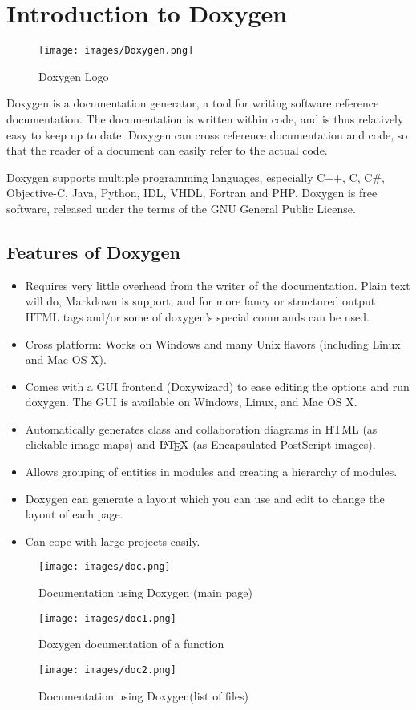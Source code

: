 \section{Introduction to Doxygen}
\begin{figure}[H]
\centering \texttt{[image: images/Doxygen.png]}
\caption{Doxygen Logo}
\end{figure}
Doxygen is a documentation generator, a tool for writing software reference 
documentation. The documentation is written within code, and is thus 
relatively easy to keep up to date. Doxygen can cross reference 
documentation and code, so that the reader of a document can easily 
refer to the actual code.

Doxygen supports multiple programming languages, especially C++, C, 
C\#, Objective-C, Java, Python, IDL, VHDL, Fortran and PHP. Doxygen
 is free software, released under the terms of the GNU General Public 
License.\\

\subsection{Features of Doxygen}
\begin{itemize}
\item Requires very little overhead from the writer of the documentation. 
Plain text will do, Markdown is support, and for more fancy or structured 
output HTML tags and/or some of doxygen's special commands can be used.
\item Cross platform: Works on Windows and many Unix flavors (including 
Linux and Mac OS X).
\item Comes with a GUI frontend (Doxywizard) to ease editing the options 
and run doxygen. The GUI is available on Windows, Linux, and Mac OS X.
\item Automatically generates class and collaboration diagrams in HTML 
(as clickable image maps) and $\mbox{\LaTeX}$ (as Encapsulated PostScript 
images).
\item Allows grouping of entities in modules and creating a hierarchy 
of modules.
\item Doxygen can generate a layout which you can use and edit to change 
the layout of each page.
\item Can cope with large projects easily.
\end{itemize}

\begin{figure}
\centering \texttt{[image: images/doc.png]}
\caption{Documentation using Doxygen (main page)}
\end{figure}


\begin{figure}
\centering \texttt{[image: images/doc1.png]}
\caption{Doxygen documentation of a function}
\end{figure}
\begin{figure}
\centering \texttt{[image: images/doc2.png]}
\caption{Documentation using Doxygen(list of files)}
\end{figure}


